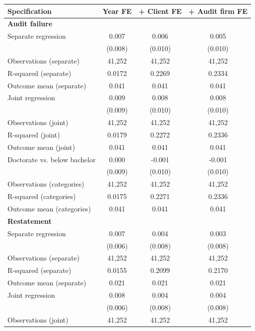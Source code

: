 \documentclass[10pt]{article}
\begin{document}
\begin{minipage}{19cm}\fontsize{10}{12}\selectfont\setlength{\tabcolsep}{4pt}\renewcommand{\arraystretch}{1.12}


\centering
{}
\begin{threeparttable}
\begin{tabular}{p{}ccc}
\toprule
Specification & Year FE & + Client FE & + Audit firm FE \\
\midrule
\multicolumn{4}{l}{\textbf{Audit failure}} \\
Separate regression & 0.007 & 0.006 & 0.005 \\
 & (0.008) & (0.010) & (0.010) \\
Observations (separate) & 41,252 & 41,252 & 41,252 \\
R-squared (separate) & 0.0172 & 0.2269 & 0.2334 \\
Outcome mean (separate) & 0.041 & 0.041 & 0.041 \\
Joint regression & 0.009 & 0.008 & 0.008 \\
 & (0.009) & (0.010) & (0.010) \\
Observations (joint) & 41,252 & 41,252 & 41,252 \\
R-squared (joint) & 0.0179 & 0.2272 & 0.2336 \\
Outcome mean (joint) & 0.041 & 0.041 & 0.041 \\
Doctorate vs. below bachelor & 0.000 & -0.001 & -0.001 \\
 & (0.009) & (0.010) & (0.010) \\
Observations (categories) & 41,252 & 41,252 & 41,252 \\
R-squared (categories) & 0.0175 & 0.2271 & 0.2336 \\
Outcome mean (categories) & 0.041 & 0.041 & 0.041 \\
\multicolumn{4}{l}{\textbf{Restatement}} \\
Separate regression & 0.007 & 0.004 & 0.003 \\
 & (0.006) & (0.008) & (0.008) \\
Observations (separate) & 41,252 & 41,252 & 41,252 \\
R-squared (separate) & 0.0155 & 0.2099 & 0.2170 \\
Outcome mean (separate) & 0.021 & 0.021 & 0.021 \\
Joint regression & 0.008 & 0.004 & 0.004 \\
 & (0.006) & (0.008) & (0.008) \\
Observations (joint) & 41,252 & 41,252 & 41,252 \\

\end{tabular}
\end{threeparttable}
\end{minipage}
\end{document}
